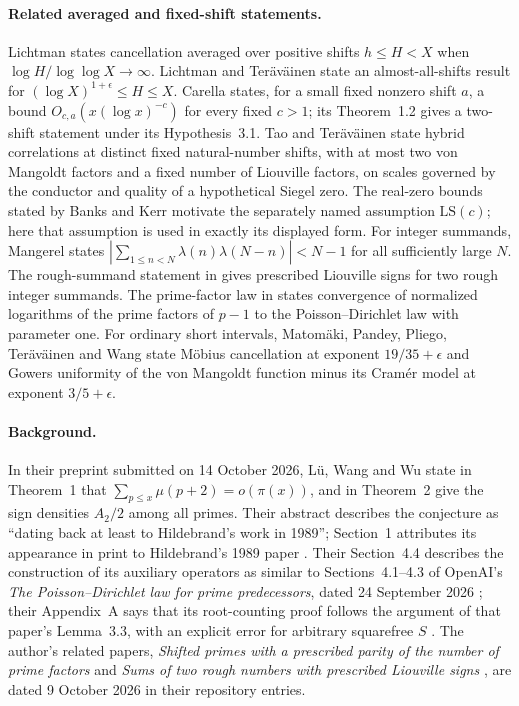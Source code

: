 \documentclass[11pt]{article}
\theoremstyle{definition}
\newcommand{\LWW}[1]{\cite[#1]{LWW}}
\theoremstyle{remark}
\numberwithin{equation}{section}
\begin{document}
\paragraph{Related averaged and fixed-shift statements.}
Lichtman \cite[Theorem~1.1]{Lichtman} states cancellation averaged over
positive shifts $h\le H<X$ when $\log H/\log\log X\to\infty$.
Lichtman and Ter\"av\"ainen \cite[Corollary~1.4]{LichtmanTeravainen}
state an almost-all-shifts result for
$(\log X)^{1+\epsilon}\le H\le X$.
Carella \cite[Theorem~1.1]{Carella} states, for a small fixed nonzero
shift $a$, a bound $O_{c,a}(x(\log x)^{-c})$ for every fixed $c>1$;
its Theorem~1.2 gives a two-shift statement under its
Hypothesis~3.1.
Tao and Ter\"av\"ainen \cite[Theorem~1.6]{TaoTeravainen}
state hybrid correlations at distinct fixed natural-number shifts, with
at most two von Mangoldt factors and a fixed number of Liouville factors,
on scales governed
by the conductor and quality of a hypothetical Siegel zero.
The real-zero bounds stated by Banks \cite{Banks} and Kerr
\cite{Kerr} motivate the separately named assumption
$\mathrm{LS}(c)$; here that assumption is used in exactly its
displayed form.
For integer summands, Mangerel \cite{Mangerel} states
$|\sum_{1\le n<N}\lambda(n)\lambda(N-n)|<N-1$ for all
sufficiently large $N$. The rough-summand statement in
\cite{GuoRGP} gives prescribed Liouville signs for two rough
integer summands. The prime-factor law in \cite{OpenAIPD}
states convergence of normalized logarithms of the prime factors
of $p-1$ to the Poisson--Dirichlet law with parameter one.
For ordinary short intervals, Matom\"aki, Pandey, Pliego,
Ter\"av\"ainen and Wang \cite{MPPTW} state M\"obius cancellation
at exponent $19/35+\epsilon$ and Gowers uniformity of the von
Mangoldt function minus its Cram\'er model at exponent
$3/5+\epsilon$.

\paragraph{Background.}\label{par:background}
In their preprint submitted on 14 October 2026, L\"u, Wang and Wu
\cite{LWW} state in Theorem~1 that
$\sum_{p\le x}\mu(p+2)=o(\pi(x))$, and in Theorem~2 give the sign
densities $A_2/2$ among all primes. Their abstract describes the
conjecture as ``dating back at least to Hildebrand's work in 1989'';
Section~1 attributes its appearance in print to Hildebrand's 1989
paper \LWW{p.~3}. Their Section~4.4 describes the construction of its
auxiliary operators as similar to Sections~4.1--4.3 of OpenAI's
\emph{The Poisson--Dirichlet law for prime predecessors}, dated
24 September 2026 \cite{OpenAIPD}; their Appendix~A says that its
root-counting proof follows the argument of that paper's Lemma~3.3,
with an explicit error for arbitrary squarefree $S$
\LWW{pp.~26, 47}.
The author's related papers, \emph{Shifted primes with a prescribed
parity of the number of prime factors} \cite{GuoSPP} and
\emph{Sums of two rough numbers with prescribed Liouville signs}
\cite{GuoRGP}, are dated 9 October 2026 in their repository entries.
\end{document}
